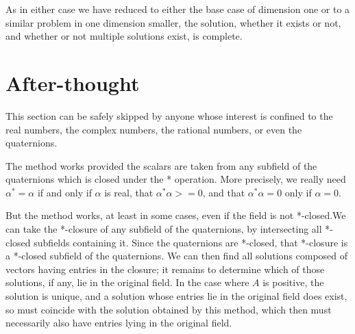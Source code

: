 \documentclass{article}
\begin{document}
As in either case we have reduced to either the base case of dimension one or to a similar problem in one dimension smaller, the solution, whether it exists or
not, and whether or not multiple solutions exist, is complete.

\section{After-thought}
This section can be safely skipped by anyone whose interest is confined to
the real numbers, the complex numbers, the rational numbers, or even the quaternions.

The method works provided the scalars are taken from any subfield of the
quaternions which is closed under the * operation. More precisely, we really
need \begin{math}\alpha^* = \alpha\end{math} if and only if \begin{math}\alpha\end{math} is real, that \begin{math}\alpha^*\alpha >= 0\end{math}, and that 
\begin{math}\alpha^*\alpha = 0\end{math} only if \begin{math}\alpha=0\end{math}.

But the method works, at least in some cases, even if the field is not *-closed.We can take the *-closure of any subfield of the quaternions, by intersecting all *-closed subfields containing it. Since the quaternions are *-closed, that *-closure is a *-closed subfield of the quaternions. We can then find all solutions composed of vectors having entries in the closure; it remains to determine
which of those solutions, if any, lie in the original field. In the case where
\begin{math}A\end{math} is positive, the solution is unique, and a solution whose entries lie in the original field does exist, so must coincide with the solution obtained by this method, which then must necessarily also have entries lying in the original field.
\end{document}
